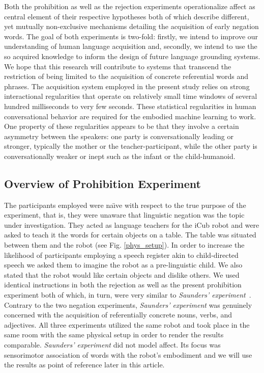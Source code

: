 Both the prohibition as well as the rejection experiments operationalize affect as central element of their respective hypotheses both of which describe different, yet mutually
non-exclusive mechanisms detailing the acquisition of early negation words.
The goal of both experiments is two-fold: firstly, we intend to improve our understanding of human language acquisition and, secondly, we intend to use
the so acquired knowledge to inform the design of future language grounding systems. We hope that this research will contribute to systems that transcend the
restriction of being limited to the acquisition of concrete referential words and phrases.
The acquisition system employed in the present study relies on strong interactional regularities that operate on relatively small time windows of several hundred
milliseconds to very few seconds. These statistical regularities in human conversational behavior are required for the embodied machine learning  
to work. One property of these regularities appears to be that they involve a certain asymmetry between the speakers: one party is conversationally leading
or stronger, typically the mother or the teacher-participant, while the other party is conversationally weaker or inept such as the infant or the child-humanoid.

\subsection{Overview of Prohibition Experiment}
The participants employed were na\"{\i}ve with respect to the true purpose of the experiment, that is, they were unaware that linguistic negation was the
topic under investigation. They acted as language teachers for the iCub robot \cite{Metta2008}  and were asked to teach it the words for certain objects
on a table. The table was situated between them and the robot (see Fig. \ref{phys_setup}). In order to increase the likelihood of participants employing a
speech register akin to child-directed speech we asked them to imagine the robot as a pre-linguistic child. We also stated that the robot would like certain
objects and dislike others. We used identical instructions in both the rejection \cite{Foerster2017} as well as the present prohibition experiment both of which,
in turn, were very similar to \emph{Saunders' experiment}~\cite{Saunders2012}. Contrary to the two negation experiments, \emph{Saunders' experiment} was genuinely 
concerned with the acquisition of referentially concrete nouns, verbs, and adjectives. All three experiments utilized the same robot and took place in the same
room with the same physical setup in order to render the results comparable. \emph{Saunders' experiment} did not model affect. Its focus was sensorimotor association
of words with the robot's embodiment and we will use the results as point of reference later in this article.

